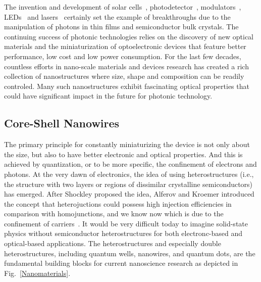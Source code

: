 The invention and development of solar
cells~\cite{sun2005organic,perlin1999space},
photodetector~\cite{razeghi1996semiconductor,rogalski2002infrared},
modulators~\cite{chen2011broadband,schuller2010plasmonics},
LEDs~\cite{spanggaard2004brief,schubert2005solid,schubert2005light} and
lasers~\cite{chow2012semiconductor,yablonovitch1987inhibited} certainly set the
example of breakthroughs due to the manipulation of photons in thin films and
semiconductor bulk crystals. The continuing success of photonic technologies
relies on the discovery of new optical materials and the miniaturization of
optoelectronic devices that feature better performance, low cost and low power
consumption. For the last few decades, countless efforts in nano-scale
materials and devices research has created a rich collection of nanostructures
where size, shape and composition can be readily controled. Many such
nanostructures exhibit fascinating optical properties that could have
significant impact in the future for photonic technology. 

\subsection{Core-Shell Nanowires} \label{sec:intro_CSNW}

The primary principle for constantly miniaturizing the device is not only about
the size, but also to have better electronic and optical properties. And
this is achieved by quantization, or to be more specific, the confinement of
electrons and photons. At the very dawn of electronics, the idea of using
heterostructures (i.e., the structure with two layers or regions of dissimilar
crystalline semiconductors) has emerged. After Shockley proposed the idea,
Alferov and Kroemer introduced the concept that heterojuctions could possess
high injection efficiencies in comparison with homojunctions, and we know now
which is due to the confinement of carriers~\cite{alferov2000double}. It would be
very difficult today to imagine solid-state physics without semiconductor
heterostructures for both electronc-based and optical-based applications. The
heterostructures and especially double heterostructures, including quantum
wells, nanowires, and quantum dots, are the fundamental building blocks for
current nanoscience research as depicted in Fig.~\ref{Nanomaterials}.


